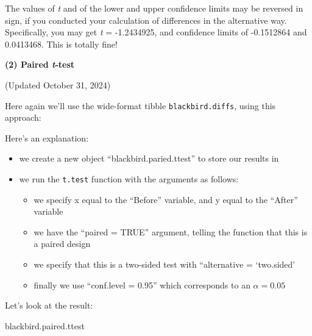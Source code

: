 \documentclass[
]{book}
\newenvironment{Shaded}{\begin{snugshade}}{\end{snugshade}}
\newcommand{\AttributeTok}[1]{\textcolor[rgb]{0.13,0.29,0.53}{#1}}
\newcommand{\ConstantTok}[1]{\textcolor[rgb]{0.56,0.35,0.01}{#1}}
\newcommand{\FloatTok}[1]{\textcolor[rgb]{0.00,0.00,0.81}{#1}}
\newcommand{\FunctionTok}[1]{\textcolor[rgb]{0.13,0.29,0.53}{\textbf{#1}}}
\newcommand{\NormalTok}[1]{#1}
\newcommand{\OtherTok}[1]{\textcolor[rgb]{0.56,0.35,0.01}{#1}}
\newcommand{\SpecialCharTok}[1]{\textcolor[rgb]{0.81,0.36,0.00}{\textbf{#1}}}
\newcommand{\StringTok}[1]{\textcolor[rgb]{0.31,0.60,0.02}{#1}}
\providecommand{\tightlist}{%
  \setlength{\itemsep}{0pt}\setlength{\parskip}{0pt}}
\begin{document}
The values of \emph{t} and of the lower and upper confidence limits may be reversed in sign, if you conducted your calculation of differences in the alternative way. Specifically, you may get \emph{t} = -1.2434925, and confidence limits of -0.1512864 and 0.0413468. This is totally fine!

\textbf{(2) Paired \emph{t}-test}

(Updated October 31, 2024)

Here again we'll use the wide-format tibble \texttt{blackbird.diffs}, using this approach:

\begin{Shaded}
\end{Shaded}

Here's an explanation:

\begin{itemize}
\tightlist
\item
  we create a new object ``blackbird.paried.ttest'' to store our results in
\item
  we run the \texttt{t.test} function with the arguments as follows:

  \begin{itemize}
  \tightlist
  \item
    we specify x equal to the ``Before'' variable, and y equal to the ``After'' variable
  \item
    we have the ``paired = TRUE'' argument, telling the function that this is a paired design
  \item
    we specify that this is a two-sided test with ``alternative = `two.sided'
  \item
    finally we use ``conf.level = 0.95'' which corresponds to an \(\alpha = 0.05\)
  \end{itemize}
\end{itemize}

Let's look at the result:

\begin{Shaded}
\begin{Highlighting}[]
\NormalTok{blackbird.paired.ttest}
\end{Highlighting}
\end{Shaded}
\end{document}

